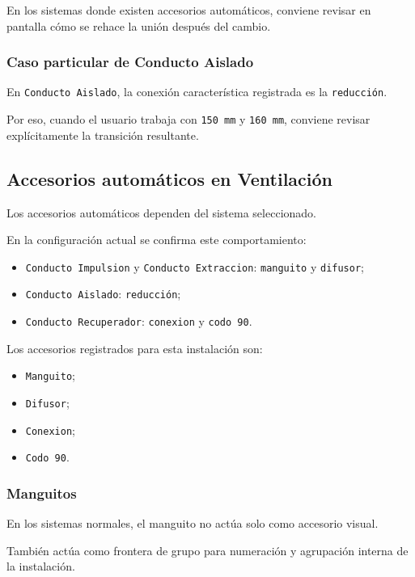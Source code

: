 \documentclass[12pt,a4paper]{article}
\begin{document}
En los sistemas donde existen accesorios automáticos, conviene revisar en pantalla cómo se rehace la unión después del cambio.

\subsubsection{Caso particular de Conducto Aislado}

En \texttt{Conducto Aislado}, la conexión característica registrada es la \texttt{reducción}.

Por eso, cuando el usuario trabaja con \texttt{150 mm} y \texttt{160 mm}, conviene revisar explícitamente la transición resultante.

\subsection{Accesorios automáticos en Ventilación}

Los accesorios automáticos dependen del sistema seleccionado.

En la configuración actual se confirma este comportamiento:

\begin{itemize}
\item \texttt{Conducto Impulsion} y \texttt{Conducto Extraccion}: \texttt{manguito} y \texttt{difusor};
\item \texttt{Conducto Aislado}: \texttt{reducción};
\item \texttt{Conducto Recuperador}: \texttt{conexion} y \texttt{codo 90}.
\end{itemize}

Los accesorios registrados para esta instalación son:

\begin{itemize}
\item \texttt{Manguito};
\item \texttt{Difusor};
\item \texttt{Conexion};
\item \texttt{Codo 90}.
\end{itemize}

\subsubsection{Manguitos}

En los sistemas normales, el manguito no actúa solo como accesorio visual.

También actúa como frontera de grupo para numeración y agrupación interna de la instalación.
\end{document}
